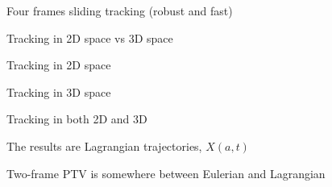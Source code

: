 \begin{frame}[label=ptv-10]{Four frames sliding tracking (robust and fast)}
    \centering{}
\end{frame}

\begin{frame}[label=ptv-11]{Tracking in 2D space vs 3D space}
    \centering{}
\end{frame}


\begin{frame}[label=ptv-12]{Tracking in 2D space}
	\centering{}
\end{frame}


\begin{frame}[label=ptv-13]{Tracking in 3D space }
	\centering{}
\end{frame}


\begin{frame}[label=ptv-14]{Tracking in both 2D and 3D}
	\centering{}
\end{frame}

			

\begin{frame}[label=ptv-15]{The results are Lagrangian trajectories, $X(a,t)$}
    \centering
\end{frame}


\begin{frame}[label=ptv-16]{Two-frame PTV is somewhere between Eulerian and Lagrangian}
    \centering{}
\end{frame}


